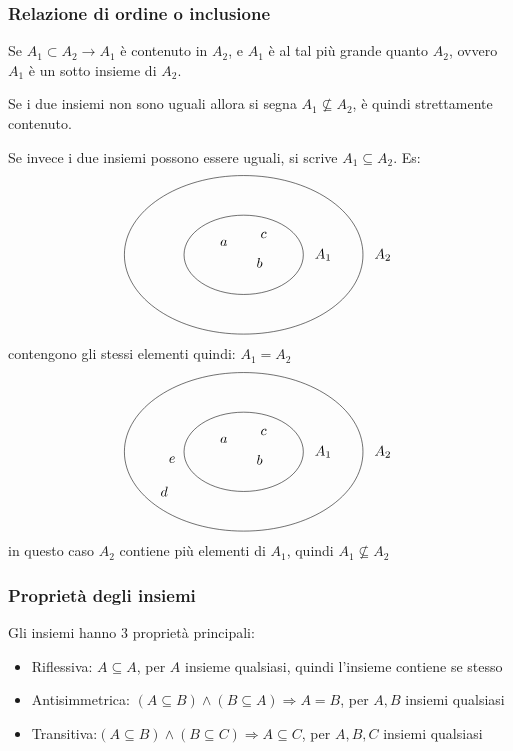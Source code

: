\documentclass[a4paper,12pt]{article}
\begin{document}
	\subsubsection{Relazione di ordine o inclusione}
	Se $A_1 \subset A_2 \rightarrow A_1$ è contenuto in $A_2$, e $A_1$ è al tal più grande quanto $A_2$, ovvero $A_1$ è un sotto insieme di $A_2$.
	
	Se i due insiemi non sono uguali allora si segna $A_1 \not \subseteq A_2$, è quindi strettamente contenuto.
	
	Se invece i due insiemi possono essere uguali, si scrive $A_1 \subseteq A_2$.
	\newpage
	Es:
	\[
	\begin{tikzpicture}
		\draw (0,0) ellipse (3cm and 2cm);
		\node at (3.5,0) {$A_2$}; %
		
		\draw (0,0) ellipse (1.5cm and 1cm);
		\node at (2,0) {$A_1$}; %
		
		\node at (-0.5,0.3) {$a$};
		\node at (0.4,-0.2) {$b$};
		\node at (0.5,+0.5) {$c$};
	\end{tikzpicture}
	\] 
	contengono gli stessi elementi quindi: $A_1 = A_2$ 
	\[
	\begin{tikzpicture}
		\draw (0,0) ellipse (3cm and 2cm);
		\node at (3.5,0) {$A_2$}; %
		
		\draw (0,0) ellipse (1.5cm and 1cm);
		\node at (2,0) {$A_1$}; %
		
		\node at (-0.5,0.3) {$a$};
		\node at (0.4,-0.2) {$b$};
		\node at (0.5,+0.5) {$c$};
		\node at (-2,-1) {$d$};
		\node at (-1.8, -0.2) {$e$};
	\end{tikzpicture}
	\]
	in questo caso $A_2$ contiene più elementi di $A_1$, quindi $A_1 \not \subseteq A_2$
	
	\subsubsection{Proprietà degli insiemi}
	Gli insiemi hanno 3 proprietà principali:
	\begin{itemize}
		\item Riflessiva: $A \subseteq A$, per $A$ insieme qualsiasi, quindi l'insieme contiene se stesso
		\item Antisimmetrica: $(A \subseteq B) \wedge (B \subseteq A) \Rightarrow A = B$, per $A, B$ insiemi qualsiasi
		\item Transitiva:$(A \subseteq B) \wedge (B \subseteq C) \Rightarrow A \subseteq C$, per $A, B, C$ insiemi qualsiasi
	\end{itemize}
	
\end{document}
